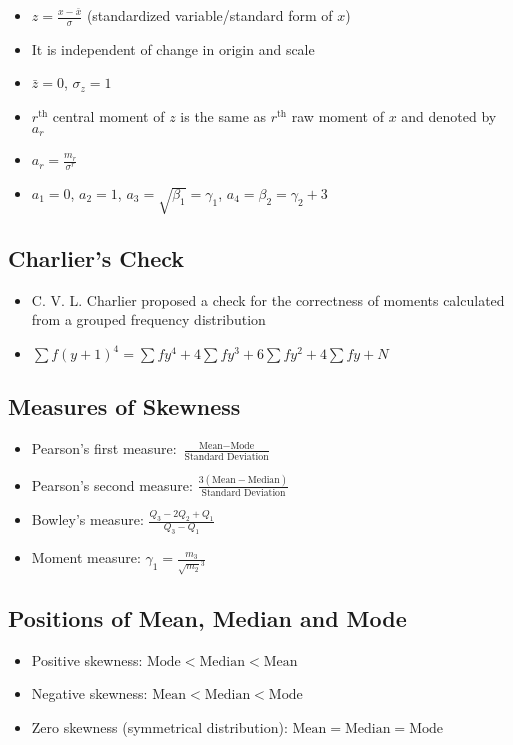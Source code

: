 \begin{itemize}
    \item $z = \frac{x - \bar{x}}{\sigma}$ (standardized variable/standard form of $x$)
    \item It is independent of change in origin and scale
    \item $\bar{z} = 0$, $\sigma_z = 1$
    \item $r^\text{th}$ central moment of $z$ is the same as $r^\text{th}$ raw moment of $x$ and denoted by $a_r$
    \item $a_r = \frac{m_r}{\sigma^r}$
    \item $a_1 = 0$, $a_2 = 1$, $a_3 = \sqrt{\beta_1} = \gamma_1$, $a_4 = \beta_2 = \gamma_2 + 3$
\end{itemize}

\subsection*{Charlier's Check}

\begin{itemize}
    \item C. V. L. Charlier proposed a check for the correctness of moments calculated from a grouped frequency distribution
    \item $\sum f(y + 1)^4 = \sum fy^4 + 4 \sum fy^3 + 6 \sum fy^2 + 4 \sum fy + N$
\end{itemize}

\subsection*{Measures of Skewness}
\begin{itemize}
    \item Pearson's first measure: $\frac{\text{Mean} - \text{Mode}}{\text{Standard Deviation}}$
    \item Pearson's second measure: $\frac{3(\text{Mean} - \text{Median})}{\text{Standard Deviation}}$
    \item Bowley's measure: $\frac{Q_3 - 2Q_2 + Q_1}{Q_3 - Q_1}$
    \item Moment measure: $\gamma_1 = \frac{m_3}{\sqrt{m_2}^3}$
\end{itemize}

\subsection*{Positions of Mean, Median and Mode}
\begin{itemize}
    \item Positive skewness: $\text{Mode} < \text{Median} < \text{Mean}$
    \item Negative skewness: $\text{Mean} < \text{Median} < \text{Mode}$
    \item Zero skewness (symmetrical distribution): $\text{Mean} = \text{Median} = \text{Mode}$
\end{itemize}

